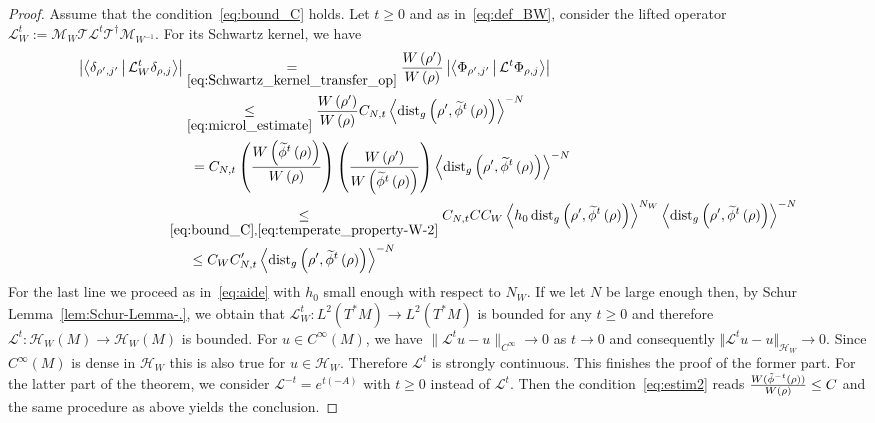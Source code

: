 \documentclass[10pt]{amsart}
\theoremstyle{definition}\newtheorem{defi}[theo]{Definition}\newtheorem{rema}[theo]{Remark}\newtheorem{exam}[theo]{Example}\newtheorem{exem}[theo]{Example}\newtheorem{nota}[theo]{Notation}
\newcommand{\clT}{\mathcal{T}}
\newcommand{\clH}{\mathcal{H}}
\newcommand{\clL}{\mathcal{L}}
\newcommand{\clM}{\mathcal{M}}
\newcommand{\dist}{\mathrm{dist}}
\let\oldtilde\tilde
\renewcommand*{\tilde}[1]{\mathchoice{\widetilde{#1}}{\widetilde{#1}}{\oldtilde{#1}}{\oldtilde{#1}}}
\begin{document}
\begin{proof}
Assume that the condition~\eqref{eq:bound_C} holds. Let $t\geq0$ and as in~\eqref{eq:def_BW}, consider the lifted operator $\clL_{W}^{t}:=\clM_{W}\clT\clL^{t}\clT^{\dagger}\clM_{W^{-1}}.$ For its Schwartz kernel, we have
\begin{align}
\left|\left\langle\delta_{\rho',j'}\,\middle|\,\clL_{W}^{t}\delta_{\rho,j}\right\rangle\right| & \underset{\eqref{eq:Schwartz_kernel_transfer_op}}{=}\frac{W\left(\rho'\right)}{W\left(\rho\right)}\left|\left\langle\Phi_{\rho',j'}\,\middle|\,\clL^{t}\Phi_{\rho,j}\right\rangle\right|\nonumber \\
& \underset{\eqref{eq:microl_estimate}}{\leq}\frac{W\left(\rho'\right)}{W\left(\rho\right)}C_{N,t}\left\langle \dist_{g}\left(\rho',\tilde{\phi}^{t}\left(\rho\right)\right)\right\rangle ^{-N}\nonumber \\
& \mkern09mu =C_{N,t}\left(\frac{W\left(\tilde{\phi}^{t}\left(\rho\right)\right)}{W\left(\rho\right)}\right)\left(\frac{W\left(\rho'\right)}{W\left(\tilde{\phi}^{t}\left(\rho\right)\right)}\right)\left\langle \dist_{g}\left(\rho',\tilde{\phi}^{t}\left(\rho\right)\right)\right\rangle ^{-N}\label{eq:bound}\nonumber
\\
& \mkern-22mu\underset{\eqref{eq:bound_C},\eqref{eq:temperate_property-W-2}}{\leq}C_{N,t}CC_{W}\left\langle h_{0}\,\dist_{g}\left(\rho',\tilde{\phi}^{t}\left(\rho\right)\right)\right\rangle ^{N_{W}}\left\langle \dist_{g}\left(\rho',\tilde{\phi}^{t}\left(\rho\right)\right)\right\rangle ^{-N}\nonumber \\
& \mkern07mu\leq C_{W}C'_{N,t}\left\langle \dist_{g}\left(\rho',\tilde{\phi}^{t}\left(\rho\right)\right)\right\rangle ^{-N}\nonumber
\end{align}
For the last line we proceed as in~\eqref{eq:aide} with $h_{0}$ small enough with respect to $N_{W}$. If we let $N$ be large enough then, by Schur Lemma~\ref{lem:Schur-Lemma-.}, we obtain that $\clL_{W}^{t}:L^{2}(T^{*}M)\rightarrow L^{2}(T^{*}M)$ is bounded for any $t\geq0$ and therefore $\clL^{t}:\clH _{W}(M)\rightarrow\clH _{W}(M)$ is bounded. For $u\in C^{\infty}\left(M\right)$, we have $\|\clL^{t}u-u\|_{C^{\infty}}\to0$ as $t\to0$ and consequently $\Vert \clL^{t}u-u\Vert _{\clH _{W}}\underset{}{\rightarrow}0$. Since $C^{\infty}(M)$ is dense in $\clH _{W}$ this is also true for $u\in\clH _{W}$. Therefore $\clL^{t}$ is strongly continuous. This finishes the proof of the former part. For the latter part of the theorem, we consider $\clL^{-t}=e^{t(-A)}$ with $t\geq0$ instead of $\clL^{t}$. Then the condition~\eqref{eq:estim2} reads $\frac{W(\tilde{\phi}^{-t}(\rho))}{W(\rho)}\leq C$ and the same procedure as above yields the conclusion.
\end{proof}
\vspace*{10pt}
\pagebreak
\end{document}
